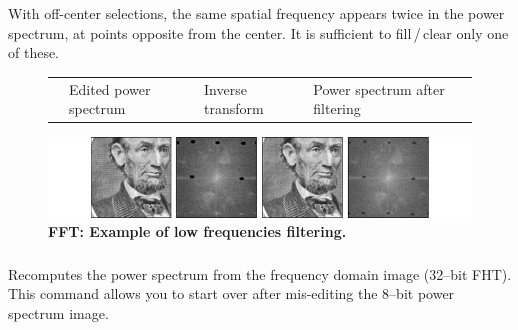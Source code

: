 With off-center selections, the same spatial frequency appears twice
in the power spectrum, at points opposite from the center. It is sufficient
to fill\,/\,clear only one of these.

\begin{figure}[h]
\noindent \setlength{\tabcolsep}{0pt}%
\begin{tabular}{>{\centering}m{}>{\centering}m{}>{\centering}m{}>{\centering}m{}}
{\footnotesize Original} & {\footnotesize Edited power spectrum} & {\footnotesize Inverse transform} & {\footnotesize Power spectrum after filtering}\tabularnewline
\end{tabular}

\noindent \includegraphics[width=1\columnwidth]{images/FFTabe}\caption{\textbf{FFT: Example of low frequencies filtering.}}
\end{figure}



\subsubsection{\protect{}}

Recomputes the power spectrum from the frequency
domain image (32--bit FHT). This command allows you to start over
after mis-editing the 8--bit power spectrum image. 


\subsubsection{\protect{}}

